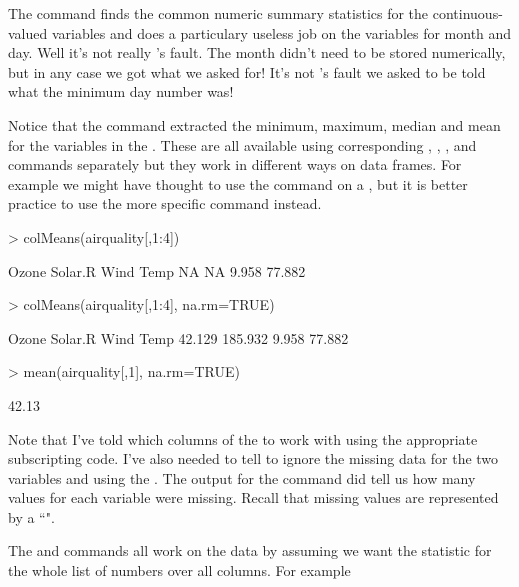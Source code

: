 The  command finds the common numeric summary statistics for the continuous-valued variables and does a particulary useless job on the variables for month and day. Well it's not really \R{}'s fault. The month didn't need to be stored numerically, but in any case we got what we asked for! It's not \R{}'s fault we asked to be told what the minimum day number was! 
 
Notice that the  command extracted the minimum, maximum, median and mean for the variables in the . These are all available using corresponding , , , and  commands separately but they work in different ways on data frames. For example we might have thought to use the  command on a , but it is better practice to use the more specific  command instead. 

\begin{Schunk}
\begin{Sinput}
> colMeans(airquality[,1:4]) 
\end{Sinput}
\begin{Soutput}
  Ozone Solar.R    Wind    Temp 
     NA      NA   9.958  77.882 
\end{Soutput}
\begin{Sinput}
> colMeans(airquality[,1:4], na.rm=TRUE) 
\end{Sinput}
\begin{Soutput}
  Ozone Solar.R    Wind    Temp 
 42.129 185.932   9.958  77.882 
\end{Soutput}
\begin{Sinput}
> mean(airquality[,1], na.rm=TRUE) 
\end{Sinput}
\begin{Soutput}
[1] 42.13
\end{Soutput}
\end{Schunk}

Note that I've told \R{} which columns of the   to work with using the appropriate subscripting code. I've also needed to tell \R{} to ignore the missing data for the two variables  and  using the . The output for the  command did tell us how many values for each variable were missing. Recall that missing values are represented by a ``". 
 
The  and  commands all work on the data by assuming we want the statistic for the whole list of numbers over all columns. For example 

